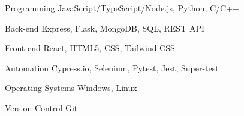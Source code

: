 

\begin{cvskills}

  \cvskill 
    {Programming} %
    {JavaScript/TypeScript/Node.js, Python, C/C++} %


  \cvskill
    {Back-end} %
    {Express, Flask, MongoDB, SQL, REST API} %

  \cvskill
    {Front-end} %
    {React, HTML5, CSS, Tailwind CSS} %

  \cvskill
    {Automation} %
    {Cypress.io, Selenium, Pytest, Jest, Super-test} %


  \cvskill
    {Operating Systems} %
    {Windows, Linux} %


  \cvskill
    {Version Control} %
    {Git} %

\end{cvskills}

